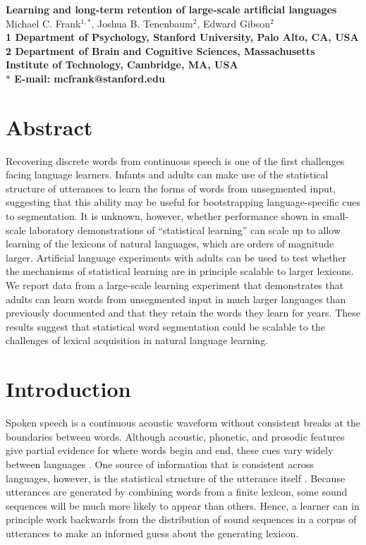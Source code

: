 \documentclass[10pt]{article}
\date{}
\begin{document}
\begin{flushleft}
{\Large
\textbf{Learning and long-term retention of large-scale artificial languages}
}
\\
Michael C. Frank$^{1,\ast}$, 
 Joshua B. Tenenbaum$^{2}$, 
Edward Gibson$^{2}$
\\
\bf{1} Department of Psychology, Stanford University, Palo Alto, CA, USA
\\
\bf{2} Department of Brain and Cognitive Sciences, Massachusetts Institute of Technology, Cambridge, MA, USA
\\
$\ast$ E-mail: mcfrank@stanford.edu
\end{flushleft}

\section*{Abstract}

Recovering discrete words from continuous speech is one of the first challenges facing language learners. Infants and adults can make use of the statistical structure of utterances to learn the forms of words from unsegmented input, suggesting that this ability may be useful for bootstrapping language-specific cues to segmentation. It is unknown, however, whether performance shown in small-scale laboratory demonstrations of ``statistical learning'' can scale up to allow learning of the lexicons of natural languages, which are orders of magnitude larger. Artificial language experiments with adults can be used to test whether the mechanisms of statistical learning are in principle scalable to larger lexicons. We report data from a large-scale learning experiment that demonstrates that adults can learn words from unsegmented input in much larger languages than previously documented and that they retain the words they learn for years. These results suggest that statistical word segmentation could be scalable to the challenges of lexical acquisition in natural language learning.

\section*{Introduction}

Spoken speech is a continuous acoustic waveform without consistent breaks at the boundaries between words. Although acoustic, phonetic, and prosodic features give partial evidence for where words begin and end, these cues vary widely between languages \cite{jusczyk2000}. One source of information that is consistent across languages, however, is the statistical structure of the utterance itself \cite{harris1951}. Because utterances are generated by combining words from a finite lexicon, some sound sequences will be much more likely to appear than others. Hence, a learner can in principle work backwards from the distribution of sound sequences in a corpus of utterances to make an informed guess about the generating lexicon. 
\end{document}
